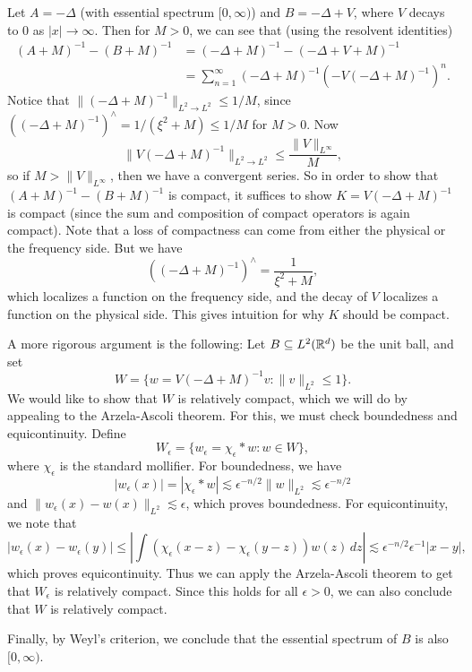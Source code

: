 \begin{example}
  Let $A = -\Delta$ (with essential spectrum
  $[0, \infty)$)
  and $B = -\Delta + V$, where $V$ decays to
  $0$ as $|x| \to \infty$. Then for $M > 0$,
  we can see that (using
  the resolvent identities)
  \begin{align*}
    (A + M)^{-1} - (B + M)^{-1}
    &= (-\Delta + M)^{-1} - (-\Delta + V + M)^{-1} \\
    &= \sum_{n = 1}^\infty (-\Delta + M)^{-1}
    (-V(-\Delta + M)^{-1})^n.
  \end{align*}
  Notice that $\|(-\Delta + M)^{-1}\|_{L^2 \to L^2} \le 1 / M$,
  since
  $((-\Delta + M)^{-1})^\wedge = 1 / (\xi^2 + M) \le 1 / M$
  for $M > 0$. Now
  \[
    \|V(-\Delta + M)^{-1}\|_{L^2 \to L^2} \le \frac{\|V\|_{L^\infty}}{M},
  \]
  so if $M > \|V\|_{L^\infty}$, then
  we have a convergent series. So in order to show
  that $(A + M)^{-1} - (B + M)^{-1}$ is compact, it
  suffices to show $K = V(-\Delta + M)^{-1}$ is compact
  (since the sum and composition of compact operators
  is again compact). Note that a loss of compactness
  can come from either the physical or the frequency
  side. But we have
  \[
    ((-\Delta + M)^{-1})^\wedge = \frac{1}{\xi^2 + M},
  \]
  which localizes a function on the frequency side,
  and the decay of $V$ localizes a function on the
  physical side. This gives intuition for why
  $K$ should be compact.

  A more rigorous argument is the following: Let
  $B \subseteq L^2(\mathbb{R}^d)$ be the unit ball, and set
  \[
    W = \{w = V(-\Delta + M)^{-1} v : \|v\|_{L^2} \le 1\}.
  \]
  We would like to show that $W$ is relatively compact,
  which we will do by appealing to the Arzela-Ascoli
  theorem. For this, we must check boundedness and
  equicontinuity. Define
  \[
    W_\epsilon = \{w_\epsilon = \chi_\epsilon * w : w \in W\},
  \]
  where $\chi_\epsilon$ is the standard mollifier.
  For boundedness, we have
  \[
    |w_\epsilon(x)| = |\chi_\epsilon * w|
    \lesssim \epsilon^{-n / 2} \|w\|_{L^2}
    \lesssim \epsilon^{-n / 2}
  \]
  and $\|w_\epsilon(x) - w(x)\|_{L^2} \lesssim \epsilon$,
  which proves boundedness. For
  equicontinuity, we note that
  \[
    |w_\epsilon(x) - w_\epsilon(y)|
    \le \left|\int (\chi_\epsilon(x - z) - \chi_\epsilon(y - z)) w(z)\, dz \right|
    \lesssim \epsilon^{-n / 2} \epsilon^{-1} |x - y|,
  \]
  which proves equicontinuity. Thus we can apply
  the Arzela-Ascoli theorem to get that $W_\epsilon$ is
  relatively compact. Since this holds for all
  $\epsilon > 0$, we can also conclude that
  $W$ is relatively compact.

  Finally, by Weyl's criterion, we conclude that
  the essential spectrum of $B$ is also $[0, \infty)$.
\end{example}
